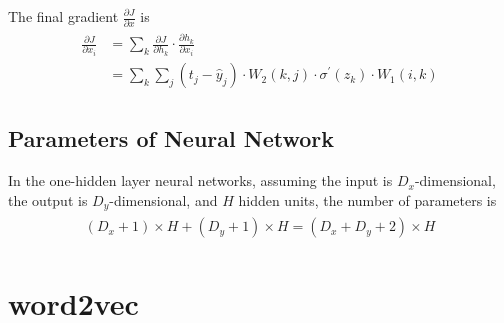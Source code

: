 \documentclass[paper=a4, fontsize=11pt]{scrartcl} %
\numberwithin{equation}{section} %
\numberwithin{figure}{section} %
\numberwithin{table}{section} %
\begin{document}
The final gradient $\frac{\partial J}{\partial x}$ is 
\begin{align} 
\begin{split}
	\frac{\partial J}{\partial x_{i}}  &= \sum_{k} \frac{\partial J}{\partial h_{k}} \cdot \frac{\partial h_{k}}{\partial x_{i}} \\
	&= \sum_{k} \sum_{j} (t_{j} - \hat{y}_{j}) \cdot W_{2}(k,j) \cdot \sigma^{\prime}(z_{k}) \cdot W_{1}(i,k) 
\end{split}					
\end{align}

\subsection{Parameters of Neural Network}
In the one-hidden layer neural networks, assuming the input is $D_{x}$-dimensional, the output is $D_{y}$-dimensional, and $H$ hidden units, the number of parameters is 
\begin{align} 
\begin{split}
	(D_{x} + 1) \times H + (D_{y}+1) \times H = (D_{x} + D_{y} + 2) \times H
\end{split}					
\end{align}


\section{word2vec}
\end{document}
